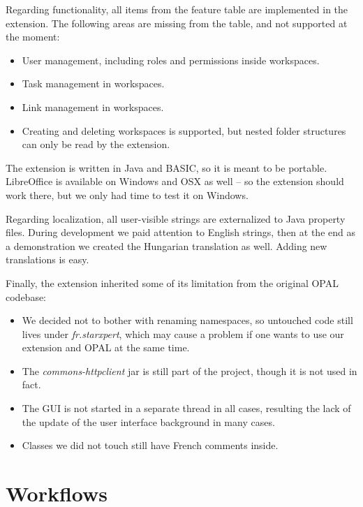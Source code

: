 Regarding functionality, all items from the feature table are implemented in
the extension. The following areas are missing from the table, and not
supported at the moment:

\begin{itemize}
\item User management, including roles and permissions inside workspaces.
\item Task management in workspaces.
\item Link management in workspaces.
\item Creating and deleting workspaces is supported, but nested folder
structures can only be read by the extension.
\end{itemize}

The extension is written in Java and BASIC, so it is meant to be portable.
LibreOffice is available on Windows and OSX as well -- so the extension should
work there, but we only had time to test it on Windows.

Regarding localization, all user-visible strings are externalized to Java
property files. During development we paid attention to English strings, then at
the end as a demonstration we created the Hungarian translation as well. Adding
new translations is easy.

Finally, the extension inherited some of its limitation from the original OPAL
codebase:

\begin{itemize}
\item We decided not to bother with renaming namespaces, so untouched code still
lives under \emph{fr.starxpert}, which may cause a problem if one wants to use
our extension and OPAL at the same time.
\item The \emph{commons-httpclient} jar is still part of the project, though it is not used in fact.
\item The GUI is not started in a separate thread in all cases, resulting the
lack of the update of the user interface background in many cases.
\item Classes we did not touch still have French comments inside.
\end{itemize}

\section{Workflows}
